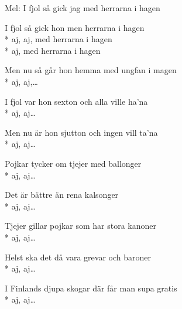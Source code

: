 \begin{SongText}
    \begin{SongInfo}
        Mel: I fjol så gick jag med herrarna i hagen
    \end{SongInfo}
    \begin{SongVerse}
        I fjol så gick hon men herrarna i hagen\\*%
        aj, aj, med herrarna i hagen\\*%
        aj, med herrarna i hagen
    \end{SongVerse}
    \begin{SongVerse}
        Men nu så går hon hemma med ungfan i magen\\*%
        aj, aj,…
    \end{SongVerse}
    \begin{SongVerse}
        I fjol var hon sexton och alla ville ha’na\\*%
        aj, aj…
    \end{SongVerse}
    \begin{SongVerse}
        Men nu är hon sjutton och ingen vill ta’na\\*%
        aj, aj…
    \end{SongVerse}
    \begin{SongVerse}
        Pojkar tycker om tjejer med ballonger\\*%
        aj, aj…
    \end{SongVerse}
    \begin{SongVerse}
        Det är bättre än rena kalsonger\\*%
        aj, aj…
    \end{SongVerse}
    \begin{SongVerse}
        Tjejer gillar pojkar som har stora kanoner\\*%
        aj, aj…
    \end{SongVerse}
    \begin{SongVerse}
        Helst ska det då vara grevar och baroner\\*%
        aj, aj…
    \end{SongVerse}
    \begin{SongVerse}
        I Finlands djupa skogar där får man supa gratis\\*%
        aj, aj…
    \end{SongVerse}
\end{SongText}
